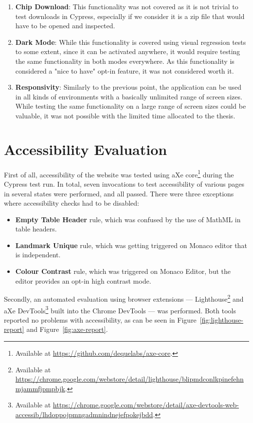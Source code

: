 \begin{enumerate}
    \item \textbf{Chip Download}: This functionality was not covered as it is not trivial to test downloads in Cypress, especially if we consider it is a zip file that would have to be opened and inspected.
    \item \textbf{Dark Mode}: While this functionality is covered using visual regression tests to some extent, since it can be activated anywhere, it would require testing the same functionality in both modes everywhere. As this functionality is considered a "nice to have" opt-in feature, it was not considered worth it.
    \item \textbf{Responsivity}: Similarly to the previous point, the application can be used in all kinds of environments with a basically unlimited range of screen sizes. While testing the same functionality on a large range of screen sizes could be valuable, it was not possible with the limited time allocated to the thesis.
\end{enumerate}

\section{Accessibility Evaluation}
\label{Evaluation-Accessibility}

First of all, accessibility of the website was tested using aXe core\footnote{Available at \url{https://github.com/dequelabs/axe-core}.} during the Cypress test run.
In total, seven invocations to test accessibility of various pages in several states were performed, and all passed.
There were three exceptions where accessibility checks had to be disabled:

\begin{itemize}
    \item \textbf{Empty Table Header} rule, which was confused by the use of MathML in table headers.
    \item \textbf{Landmark Unique} rule, which was getting triggered on Monaco editor that is independent.
    \item \textbf{Colour Contrast} rule, which was triggered on Monaco Editor, but the editor provides an opt-in high contrast mode.
\end{itemize}

Secondly, an automated evaluation using browser extensions --- Lighthouse\footnote{Available at \url{https://chrome.google.com/webstore/detail/lighthouse/blipmdconlkpinefehnmjammfjpmpbjk}.} and aXe DevTools\footnote{Available at \url{https://chrome.google.com/webstore/detail/axe-devtools-web-accessib/lhdoppojpmngadmnindnejefpokejbdd}.} built into the Chrome DevTools --- was performed.
Both tools reported no problems with accessibility, as can be seen in Figure~\ref{fig:lighthouse-report} and Figure~\ref{fig:axe-report}.

